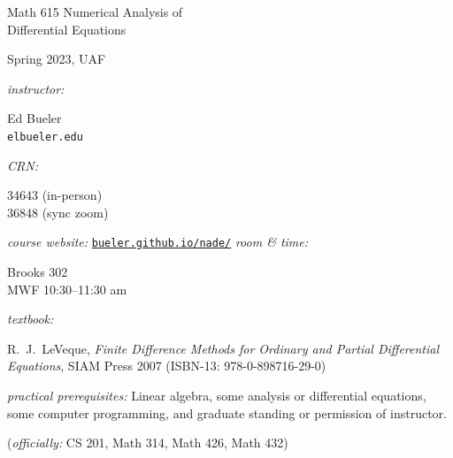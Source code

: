 \documentclass[12pt]{amsart}
\begin{document}
\begin{center}
\LARGE Math 615 Numerical Analysis of \\ Differential Equations

\large \medskip
Spring 2023, UAF
\end{center}

\thispagestyle{empty}
\bigskip

\noindent \emph{instructor:} \begin{minipage}[t]{0.5\textwidth} Ed Bueler \\ \texttt{elbueler\@@alaska.edu} \end{minipage} \hfill \emph{CRN:}\, \begin{minipage}[t]{0.25\textwidth} 34643 (in-person) \\ 36848 (sync zoom) \end{minipage}

\medskip
\noindent \emph{course website:} \href{https://bueler.github.io/nade/}{\texttt{bueler.github.io/nade/}} \hfill \emph{room \& time:} \begin{minipage}[t]{0.25\textwidth} Brooks 302 \\ MWF 10:30--11:30 am \end{minipage}

\bigskip
\noindent \emph{textbook:} \begin{minipage}[t]{0.6\textwidth} R.~J.~LeVeque, \emph{Finite Difference Methods for Ordinary and Partial Differential Equations}, SIAM Press 2007 {\footnotesize (ISBN-13: 978-0-898716-29-0)} \end{minipage}

\bigskip
\noindent \emph{practical prerequisites:} Linear algebra, some analysis or differential equations, some computer programming, and graduate standing or permission of instructor.

\smallskip
\noindent (\emph{officially:} CS 201, Math 314, Math 426, Math 432)


\begin{figure}
\end{figure}
\end{document}
